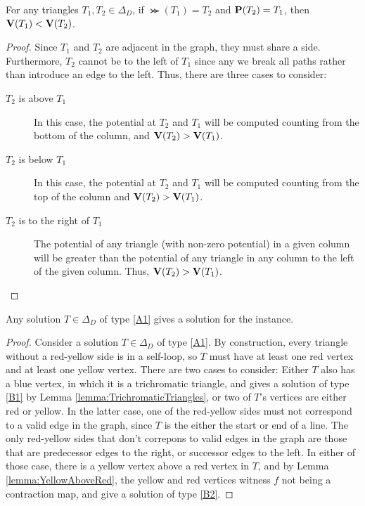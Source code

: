   \begin{lemma} \label{lemma:PotentialsIncreaseAlongPaths}
    For any triangles $T_1,T_2 \in \Delta_D$, if $\Succ(T_1) = T_2$ and $\mathbf{P}(T_2) = T_1$, then $\mathbf{V}(T_1) < \mathbf{V}(T_2)$. 
  \end{lemma}

  \begin{proof}
    Since $T_1$ and $T_2$ are adjacent in the \EOPL graph, they must share a side. Furthermore, $T_2$ cannot be to the left of $T_1$ since any we break all paths rather than introduce an edge to the left. Thus, there are three cases to consider:
    \begin{description}
    \item[$T_2$ is above $T_1$] In this case, the potential at $T_2$ and $T_1$ will be computed counting from the bottom of the column, and $\mathbf{V}(T_2) > \mathbf{V}(T_1)$.
    \item[$T_2$ is below $T_1$] In this case, the potential at $T_2$ and $T_1$ will be computed counting from the top of the column and $\mathbf{V}(T_2) > \mathbf{V}(T_1)$. 
    \item[$T_2$ is to the right of $T_1$] The potential of any triangle (with non-zero potential) in a given column will be greater than the potential of any triangle in any column to the left of the given column. Thus, $\mathbf{V}(T_2) > \mathbf{V}(T_1)$.
    \end{description}
  \end{proof}

  \begin{lemma} \label{EndOfLineSolutions}
    Any solution $T \in \Delta_D$ of type \ref{A1} gives a solution for the \TwoDContractionMap instance.
  \end{lemma}
  \begin{proof}
     Consider a solution $T \in \Delta_D$ of type \ref{A1}. By construction, every triangle without a red-yellow side is in a self-loop, so $T$ must have at least one red vertex and at least one yellow vertex. There are two cases to consider: Either $T$ also has a blue vertex, in which it is a trichromatic triangle, and gives a solution of type \ref{B1} by Lemma \ref{lemma:TrichromaticTriangles}, or two of $T$'s vertices are either red or yellow. In the latter case, one of the red-yellow sides must not correspond to a valid edge in the graph, since $T$ is the either the start or end of a line. The only red-yellow sides that don't correpons to valid edges in the graph are those that are predecessor edges to the right, or successor edges to the left. In either of those case, there is a yellow vertex above a red vertex in $T$, and by Lemma \ref{lemma:YellowAboveRed}, the yellow and red vertices witness $f$ not being a contraction map, and give a solution of type \ref{B2}.
    \end{proof}
    
